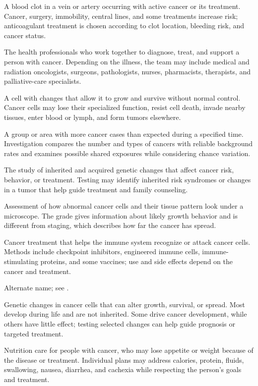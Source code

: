  A blood clot in a vein or artery occurring with active cancer or its treatment. Cancer, surgery, immobility, central lines, and some treatments increase risk; anticoagulant treatment is chosen according to clot location, bleeding risk, and cancer status.

 The health professionals who work together to diagnose, treat, and support a person with cancer. Depending on the illness, the team may include medical and radiation oncologists, surgeons, pathologists, nurses, pharmacists, therapists, and palliative-care specialists.

 A cell with changes that allow it to grow and survive without normal control. Cancer cells may lose their specialized function, resist cell death, invade nearby tissues, enter blood or lymph, and form tumors elsewhere.

 A group or area with more cancer cases than expected during a specified time. Investigation compares the number and types of cancers with reliable background rates and examines possible shared exposures while considering chance variation.

 The study of inherited and acquired genetic changes that affect cancer risk, behavior, or treatment. Testing may identify inherited risk syndromes or changes in a tumor that help guide treatment and family counseling.

 Assessment of how abnormal cancer cells and their tissue pattern look under a microscope. The grade gives information about likely growth behavior and is different from staging, which describes how far the cancer has spread.

 Cancer treatment that helps the immune system recognize or attack cancer cells. Methods include checkpoint inhibitors, engineered immune cells, immune-stimulating proteins, and some vaccines; use and side effects depend on the cancer and treatment.

 Alternate name; see .

 Genetic changes in cancer cells that can alter growth, survival, or spread. Most develop during life and are not inherited. Some drive cancer development, while others have little effect; testing selected changes can help guide prognosis or targeted treatment.

 Nutrition care for people with cancer, who may lose appetite or weight because of the disease or treatment. Individual plans may address calories, protein, fluids, swallowing, nausea, diarrhea, and cachexia while respecting the person's goals and treatment.

